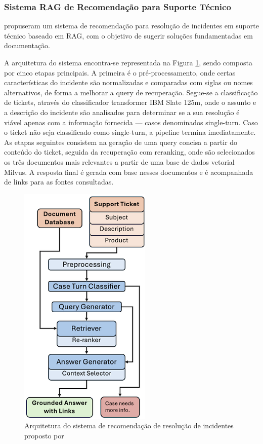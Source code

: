 \subsubsection{Sistema RAG de Recomendação para Suporte Técnico} 

\cite{isaza2024retrieval} propuseram um sistema de recomendação para resolução de incidentes em suporte técnico baseado em RAG, com o objetivo de sugerir soluções fundamentadas em documentação.


A arquitetura do sistema encontra-se representada na Figura \ref{fig:ticket-recomendation-rag}, sendo composta por cinco etapas principais. A primeira é o pré-processamento, onde certas características do incidente são normalizadas e comparadas com siglas ou nomes alternativos, de forma a melhorar a query de recuperação. Segue-se a classificação de tickets, através do classificador transformer IBM Slate 125m, onde o assunto e a descrição do incidente são analisados para determinar se a sua resolução é viável apenas com a informação fornecida — casos denominados single-turn. Caso o ticket não seja classificado como single-turn, a pipeline termina imediatamente.
As etapas seguintes consistem na geração de uma query concisa a partir do conteúdo do ticket, seguida da recuperação com reranking, onde são selecionados os três documentos mais relevantes a partir de uma base de dados vetorial Milvus. A resposta final é gerada com base nesses documentos e é acompanhada de links para as fontes consultadas.

\begin{figure}[H]
        \centering
        \includegraphics[width=0.3\linewidth]{ch3/assets/ticket-recomendation-rag.png
        }
        \caption{Arquitetura do sistema de recomendação de resolução de incidentes proposto por  \cite{isaza2024retrieval}}
        \label{fig:ticket-recomendation-rag}
\end{figure}


